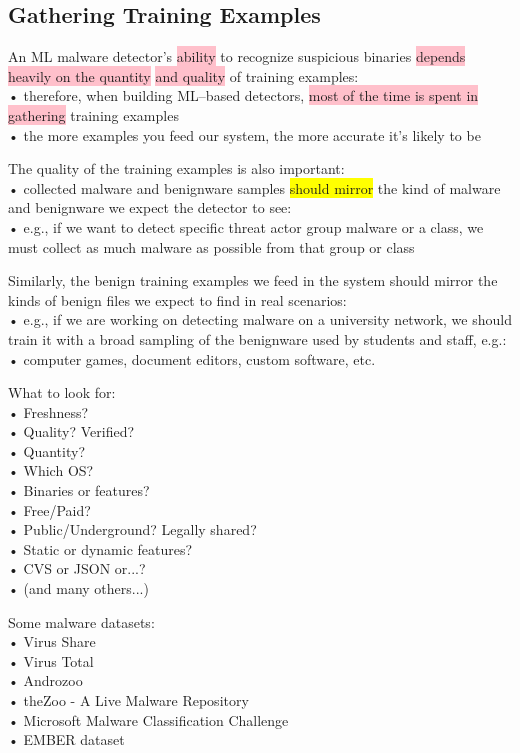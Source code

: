 \documentclass[]{project_plan}
\begin{document}
\subsection{Gathering Training Examples}

An ML malware detector’s \colorbox{pink}{ability} to recognize suspicious binaries \colorbox{pink}{depends heavily on the quantity} \colorbox{pink}{and quality} of training examples:\\
• therefore, when building ML–based detectors, \colorbox{pink}{most of the time is spent in gathering} training examples\\
• the more examples you feed our system, the more accurate it’s likely to be

The quality of the training examples is also important:\\
• collected malware and benignware samples \colorbox{yellow}{should mirror} the kind of malware and benignware we expect the detector to see:\\
• e.g., if we want to detect specific threat actor group malware or a class, we must collect as much malware as possible from that group or class

Similarly, the benign training examples we feed in the system should mirror the kinds of benign files we expect to find in real scenarios:\\
• e.g., if we are working on detecting malware on a university network, we should train it with a broad sampling of the benignware used by students and staff, e.g.:\\
• computer games, document editors, custom software, etc.

What to look for:\\
• Freshness?\\
• Quality? Verified?\\
• Quantity?\\
• Which OS?\\
• Binaries or features?\\
• Free/Paid?\\
• Public/Underground? Legally shared?\\
• Static or dynamic features?\\
• CVS or JSON or...?\\
• (and many others...)

Some malware datasets:\\
• Virus Share\\
• Virus Total\\
• Androzoo\\
• theZoo - A Live Malware Repository\\
• Microsoft Malware Classification Challenge\\
• EMBER dataset
\end{document}
